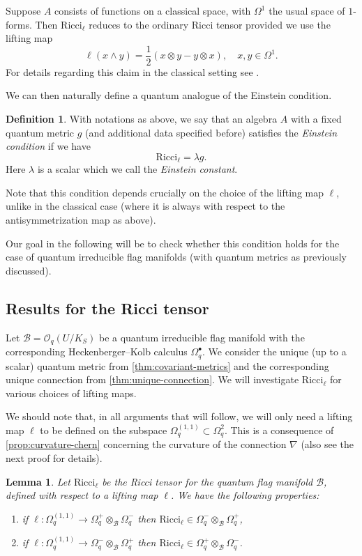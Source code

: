 \documentclass[a4paper,12pt,reqno,english]{amsart}
\numberwithin{equation}{section}
\numberwithin{figure}{section}
\theoremstyle{plain}
\theoremstyle{plain}
\theoremstyle{plain}
\theoremstyle{plain}
\newtheorem{lemma}[theorem]{Lemma}
\theoremstyle{plain}
\theoremstyle{definition}
\newtheorem{definition}[theorem]{Definition}
\theoremstyle{definition}
\theoremstyle{definition}
\theoremstyle{remark}
\theoremstyle{definition}
\newcommand{\Oqflag}{\mathcal{O}_q(U / K_S)}
\newcommand{\qalg}{\mathcal{B}}
\newcommand{\Ricci}{\mathrm{Ricci}}
\newcommand{\liftmap}{\ell}
\newcommand{\diffcalc}{\Omega_q}
\begin{document}
Suppose $A$ consists of functions on a classical space, with $\Omega^1$ the usual space of $1$-forms.
Then $\Ricci_\ell$ reduces to the ordinary Ricci tensor provided we use the lifting map
\[
\ell(x \wedge y) = \frac{1}{2} (x \otimes y - y \otimes x), \quad
x, y \in \Omega^1.
\]
For details regarding this claim in the classical setting see \cite[Example 8.10]{quantum-book}.

We can then naturally define a quantum analogue of the Einstein condition.

\begin{definition}
With notations as above, we say that an algebra $A$ with a fixed quantum metric $g$ (and additional data specified before) satisfies the \emph{Einstein condition} if we have
\[
\Ricci_\ell = \lambda g.
\]
Here $\lambda$ is a scalar which we call the \emph{Einstein constant}.
\end{definition}

Note that this condition depends crucially on the choice of the lifting map $\ell$, unlike in the classical case (where it is always with respect to the antisymmetrization map as above).

Our goal in the following will be to check whether this condition holds for the case of quantum irreducible flag manifolds (with quantum metrics as previously discussed).

\subsection{Results for the Ricci tensor}

Let $\qalg = \Oqflag$ be a quantum irreducible flag manifold with the corresponding Heckenberger--Kolb calculus $\diffcalc^\bullet$.
We consider the unique (up to a scalar) quantum metric from \cref{thm:covariant-metrics} and the corresponding unique connection from \cref{thm:unique-connection}.
We will investigate $\Ricci_\liftmap$ for various choices of lifting maps.

We should note that, in all arguments that will follow, we will only need a lifting map $\liftmap$ to be defined on the subspace $\diffcalc^{(1, 1)} \subset \diffcalc^2$.
This is a consequence of \cref{prop:curvature-chern} concerning the curvature of the connection $\nabla$ (also see the next proof for details).

\begin{lemma}
\label{lem:ricci-lifting}
Let $\Ricci_\liftmap$ be the Ricci tensor for the quantum flag manifold $\qalg$, defined with respect to a lifting map $\liftmap$.
We have the following properties:
\begin{enumerate}
\item if $\liftmap : \diffcalc^{(1, 1)} \to \diffcalc^+ \otimes_\qalg \diffcalc^-$ then $\Ricci_\liftmap \in \diffcalc^- \otimes_\qalg \diffcalc^+$,
\item if $\liftmap : \diffcalc^{(1, 1)} \to \diffcalc^- \otimes_\qalg \diffcalc^+$ then $\Ricci_\liftmap \in \diffcalc^+ \otimes_\qalg \diffcalc^-$.
\end{enumerate}
\end{lemma}
\end{document}
